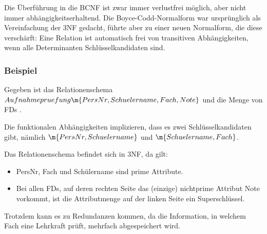 \documentclass{bschlangaul-haupt}
\begin{document}
Die Überführung in die BCNF ist zwar immer verlustfrei möglich, aber
nicht immer abhängigkeitserhaltend. Die Boyce-Codd-Normalform war
ursprünglich als Vereinfachung der 3NF gedacht, führte aber zu einer
neuen Normalform, die diese verschärft: Eine Relation ist automatisch
frei von transitiven Abhängigkeiten, wenn alle Determinanten
Schlüsselkandidaten sind.





\subsubsection{Beispiel}

Gegeben ist das Relationenschema
$Aufnahmepruefung\m{PersNr, Schuelername, Fach, Note}$
und die Menge von FDs
.

Die funktionalen Abhängigkeiten implizieren, dass es zwei
Schlüsselkandidaten gibt, nämlich
$\m{PersNr, Schuelername}$ und
$\m{Schuelername, Fach}$.

Das Relationenschema befindet sich in 3NF, da gilt:

\begin{itemize}
\item PersNr, Fach und Schülername sind prime Attribute.

\item Bei allen FDs, auf deren rechten Seite das (einzige) nichtprime
Attribut Note vorkommt, ist die Attributmenge auf der linken Seite ein
Superschlüssel.
\end{itemize}

Trotzdem kann es zu Redundanzen kommen, da die Information, in welchem
Fach eine Lehrkraft prüft, mehrfach abgespeichert wird.

\literatur
\end{document}
